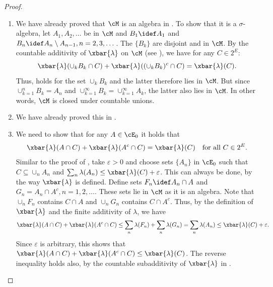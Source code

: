 \begin{proof}
	\begin{enumerate}
		\item We have already proved that $\cM$ is an algebra in . To show that it is a $\sigma$-algebra, let $A_1, A_2, \dots$ be in $\cM$ and $B_1 \idef A_1$ and $B_n \idef A_n \setminus A_{n-1}, n=2, 3, \dots$. The $\{B_k\}$ are disjoint and in $\cM$. By the countable additivity of $\xbar{\lambda}$ on $\cM$ (see ), we have for any $C \in 2^E$:
		      \begin{equation*}
			      \xbar{\lambda}(\cup_k B_k \cap C) + \xbar{\lambda}((\cup_k B_k)^c \cap C) = \xbar{\lambda}(C).
		      \end{equation*}
		      Thus,  holds for the set $\cup_k B_k$ and the latter therefore lies in $\cM$. But since $\cup_{k=1}^n B_k = A_n$ and $\cup_{k=1}^\infty B_k = \cup_{k=1}^\infty A_k$, the latter also lies in $\cM$. In other words, $\cM$ is closed under countable unions.

		\item We have already proved this in .

		\item We need to show that for any $A \in \cE_0$ it holds that
		      \begin{equation*}
			      \xbar{\lambda}(A \cap C) + \xbar{\lambda}(A^c \cap C) = \xbar{\lambda}(C) \quad \text{for all } C \in 2^E.
		      \end{equation*}
		      Similar to the proof of , take $\varepsilon > 0$ and choose sets $\{A_n\}$ in $\cE_0$ such that $C \subseteq \cup_n A_n$ and $\sum_n \lambda(A_n) \le \xbar{\lambda}(C) + \varepsilon$. This can always be done, by the way $\xbar{\lambda}$ is defined. Define sets $F_n \idef A_n \cap A$ and $G_n = A_n \cap A^c, n=1, 2, \dots$. These sets lie in $\cM$ as it is an algebra. Note that $\cup_n F_n$ contains $C \cap A$ and $\cup_n G_n$ contains $C \cap A^c$. Thus, by the definition of $\xbar{\lambda}$ and the finite additivity of $\lambda$, we have
		      \begin{equation*}
			      \xbar{\lambda}(A \cap C) + \xbar{\lambda}(A^c \cap C) \le \sum_n \lambda(F_n) + \sum_n \lambda(G_n) = \sum_n \lambda(A_n) \le \xbar{\lambda}(C) + \varepsilon.
		      \end{equation*}
		      Since $\varepsilon$ is arbitrary, this shows that $\xbar{\lambda}(A \cap C) + \xbar{\lambda}(A^c \cap C) \le \xbar{\lambda}(C)$. The reverse inequality holds also, by the countable subadditivity of $\xbar{\lambda}$ in .


\end{enumerate}
\end{proof}
